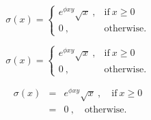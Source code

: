 \documentclass[a4paper]{article}
\begin{document}
    \begin{equation}
    \sigma(x) = 
    \begin{cases}
        e^{\phi xy} \sqrt{x}~, & \text{if} ~x\geq 0\\
        0~,                    & \text{otherwise.}
    \end{cases}
    \end{equation}

    \begin{equation}
        \sigma(x) = 
        \left\{
        \begin{array}{ll}
            e^{\phi xy} \sqrt{x}~, & \text{if}~ x\geq 0\\
            0~,                    & \text{otherwise.}
        \end{array}
        \right.
    \end{equation}

    \begin{eqnarray}
        \sigma(x) &=& e^{\phi xy} \sqrt{x}~,\quad \text{if}~ x\geq 0\\
                  &=& 0~,\quad \text{otherwise.}
    \end{eqnarray}
\end{document}
